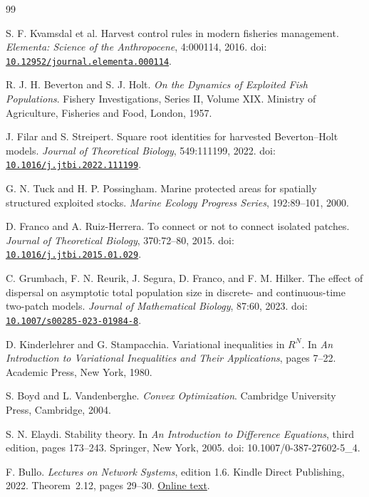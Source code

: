 \documentclass{article}
\numberwithin{equation}{section}
\begin{document}
\begin{thebibliography}{99}

S. F. Kvamsdal et al.
Harvest control rules in modern fisheries management.
\textit{Elementa: Science of the Anthropocene}, 4:000114, 2016.
doi: \href{https://doi.org/10.12952/journal.elementa.000114}{\nolinkurl{10.12952/journal.elementa.000114}}.

R. J. H. Beverton and S. J. Holt.
\textit{On the Dynamics of Exploited Fish Populations}.
Fishery Investigations, Series II, Volume XIX.
Ministry of Agriculture, Fisheries and Food, London, 1957.

J. Filar and S. Streipert.
Square root identities for harvested Beverton--Holt models.
\textit{Journal of Theoretical Biology}, 549:111199, 2022.
doi: \href{https://doi.org/10.1016/j.jtbi.2022.111199}{\nolinkurl{10.1016/j.jtbi.2022.111199}}.

G. N. Tuck and H. P. Possingham.
Marine protected areas for spatially structured exploited stocks.
\textit{Marine Ecology Progress Series}, 192:89--101, 2000.

D. Franco and A. Ruiz-Herrera.
To connect or not to connect isolated patches.
\textit{Journal of Theoretical Biology}, 370:72--80, 2015.
doi: \href{https://doi.org/10.1016/j.jtbi.2015.01.029}{\nolinkurl{10.1016/j.jtbi.2015.01.029}}.

C. Grumbach, F. N. Reurik, J. Segura, D. Franco, and F. M. Hilker.
The effect of dispersal on asymptotic total population size in discrete-
and continuous-time two-patch models.
\textit{Journal of Mathematical Biology}, 87:60, 2023.
doi: \href{https://doi.org/10.1007/s00285-023-01984-8}{\nolinkurl{10.1007/s00285-023-01984-8}}.

D. Kinderlehrer and G. Stampacchia.
Variational inequalities in $R^N$.
In \textit{An Introduction to Variational Inequalities and Their
Applications}, pages 7--22.
Academic Press, New York, 1980.

S. Boyd and L. Vandenberghe.
\textit{Convex Optimization}.
Cambridge University Press, Cambridge, 2004.

S. N. Elaydi.
Stability theory.
In \textit{An Introduction to Difference Equations}, third edition,
pages 173--243.
Springer, New York, 2005.
doi: 10.1007/0-387-27602-5\_4.

F. Bullo.
\textit{Lectures on Network Systems}, edition 1.6.
Kindle Direct Publishing, 2022.
Theorem~2.12, pages 29--30.
\href{https://muwo1.unibo.it/sidra2022deiuniboit/wp-content/uploads/sites/18/2022/06/LecturesNetworkSystems-FB.pdf}{Online text}.

\end{thebibliography}
\end{document}
